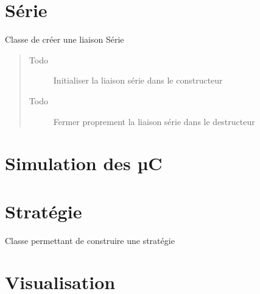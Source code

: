 \documentclass[letterpaper,10pt,french]{sphinxmanual}
\begin{document}
\chapter{Série}
\label{serie:module-lib.serie}\label{serie::doc}\label{serie:serie}

\begin{fulllineitems}
\label{serie:lib.serie.Serie}
Classe de créer une liaison Série
\begin{quote}\begin{description}
\item[{Todo }] \leavevmode
Initialiser la liaison série dans le constructeur

\item[{Todo }] \leavevmode
Fermer proprement la liaison série dans le destructeur

\end{description}\end{quote}

\end{fulllineitems}



\chapter{Simulation des µC}
\label{simul_uc:module-lib.simul_uc}\label{simul_uc::doc}\label{simul_uc:simulation-des-c}

\chapter{Stratégie}
\label{strategie:module-lib.strategie}\label{strategie::doc}\label{strategie:strategie}

\begin{fulllineitems}
\label{strategie:lib.strategie.Strategie}
Classe permettant de construire une stratégie

\end{fulllineitems}



\chapter{Visualisation}
\label{visualisation::doc}\label{visualisation:visualisation}
\end{document}
